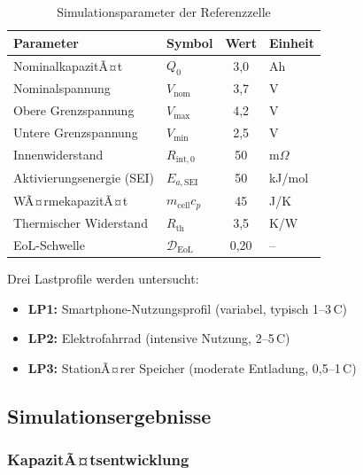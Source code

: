 ﻿\documentclass[12pt,a4paper]{article}
\begin{document}
	\begin{table}[H]
		\centering
		\caption{Simulationsparameter der Referenzzelle}
		\label{tab:params}
		\begin{tabular}{llcl}
			\toprule
			\textbf{Parameter} & \textbf{Symbol} & \textbf{Wert} & \textbf{Einheit} \\
			\midrule
			NominalkapazitÃ¤t & $Q_0$ & 3{,}0 & Ah \\
			Nominalspannung & $V_\mathrm{nom}$ & 3{,}7 & V \\
			Obere Grenzspannung & $V_\mathrm{max}$ & 4{,}2 & V \\
			Untere Grenzspannung & $V_\mathrm{min}$ & 2{,}5 & V \\
			Innenwiderstand & $R_\mathrm{int,0}$ & 50 & m$\Omega$ \\
			Aktivierungsenergie (SEI) & $E_{a,\mathrm{SEI}}$ & 50 & kJ/mol \\
			WÃ¤rmekapazitÃ¤t & $m_\mathrm{cell}c_p$ & 45 & J/K \\
			Thermischer Widerstand & $R_\mathrm{th}$ & 3{,}5 & K/W \\
			EoL-Schwelle & $\mathcal{D}_\mathrm{EoL}$ & 0{,}20 & -- \\
			\bottomrule
		\end{tabular}
	\end{table}
	
	Drei Lastprofile werden untersucht:
	\begin{itemize}
		\item \textbf{LP1:} Smartphone-Nutzungsprofil (variabel, typisch 1--3\,C)
		\item \textbf{LP2:} Elektrofahrrad (intensive Nutzung, 2--5\,C)
		\item \textbf{LP3:} StationÃ¤rer Speicher (moderate Entladung, 0{,}5--1\,C)
	\end{itemize}
	
	\subsection{Simulationsergebnisse}
	
	\subsubsection{KapazitÃ¤tsentwicklung}
	
\end{document}
